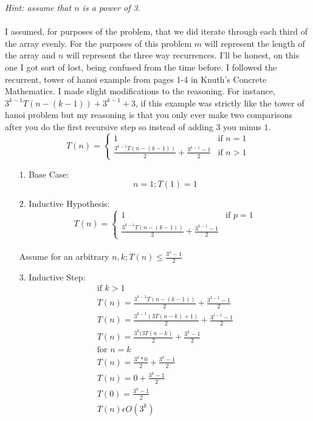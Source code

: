 \documentclass[paper=a4,fontsize=11pt]{article}
\begin{document}
\begin{enumerate}
\textit{Hint: assume that $n$ is a power of 3}.\\\\
I assumed, for purposes of the problem, that we did iterate through each third of the array evenly. For the purposes of this problem $m$ will represent the length of the array and $n$ will represent the three way recurrences. I'll be honest, on this one I got sort of lost, being confused from the time before. I followed the recurrent, tower of hanoi example from pages 1-4 in Knuth's Concrete Mathematics. I made slight modifications to the reasoning. For instance, $3^{k-1}T(n-(k-1)) + 3^{k-1} + 3$, if this example was strictly like the tower of hanoi problem but my reasoning is that you only ever make two comparisons after you do the first recursive step so instead of adding $3$ you minus $1$.
\[
  T(n) =
    \begin{cases}
        1 & \text{if $n = 1$} \\
        \frac{3^{k-1}T(n-(k-1))}{2} + \frac{3^{k-1} - 1}{2} & \text{if $n > 1$}
    \end{cases}
\]
\begin{enumerate}
\item[1.] Base Case:\\
$$n = 1; T(1) = 1$$
\item[2.] Inductive Hypothesis:\\
\[
  T(n) =
    \begin{cases}
        1 & \text{if $p = 1$} \\
        \frac{3^{k-1}T(n-(k-1))}{2} + \frac{3^{k-1} - 1}{2}
    \end{cases}
\]
\\Assume for an arbitrary $n,k; T(n) \leq \frac{3^o-1}{2}$
\item[3.] Inductive Step:
\begin{gather*}
\text{if $k > 1$}\\
T(n) = \frac{3^{k-1}T(n-(k-1))}{2} + \frac{3^{k-1} - 1}{2}\\
T(n) = \frac{3^{k-1}(3T(n-k)+ 1)}{2} + \frac{3^{j-1} - 1}{2}\\
T(n) = \frac{3^{k}(3T(n-k)}{2} + \frac{3^{k} - 1}{2}\\
\text{for $n = k$}\\
T(n) = \frac{3^{k}*0}{2} + \frac{3^{k} - 1}{2}\\
T(n) = 0 + \frac{3^{k} - 1}{2}\\
T(0) = \frac{3^{k} - 1}{2}\\
T(n) \epsilon O(3^k)\\
\end{gather*}
\end{enumerate}
\end{enumerate}
\end{document}
